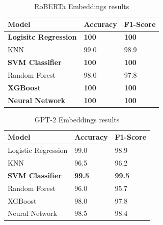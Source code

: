 \begin{table}[hbt!]
\begin{threeparttable}
\caption{RoBERTa Embeddings results}
\label{roberta_embeddings_results}
\begin{tabular}{lll}
\toprule
\headrow Model & Accuracy & F1-Score\\
\midrule
 \textbf{Logisitc Regression}              &      \textbf{100}   &      \textbf{100}   \\
 KNN             &       99.0   &       98.9 \\
 \textbf{SVM Classifier}             &      \textbf{100}   &      \textbf{100}   \\
 Random Forest    &       98.0   &       97.8 \\
 \textbf{XGBoost}         &      \textbf{100}   &      \textbf{100}   \\
 \textbf{Neural Network}   &      \textbf{100}   &      \textbf{100}   \\
\bottomrule
\end{tabular}
\end{threeparttable}
\end{table}

\begin{table}[hbt!]
\begin{threeparttable}
\caption{GPT-2 Embeddings results}
\label{gpt2_embeddings_results}
\begin{tabular}{lll}
\toprule
\headrow Model & Accuracy & F1-Score\\
\midrule
 Logistic Regression                 &       99.0   &       98.9 \\
 KNN                &       96.5 &       96.2 \\
 \textbf{SVM Classifier}                &       \textbf{99.5} &       \textbf{99.5} \\
 Random Forest       &       96.0   &       95.7 \\
 XGBoost            &       98.0   &       97.8 \\
 Neural Network      &       98.5 &       98.4 \\
\bottomrule
\end{tabular}
\end{threeparttable}
\end{table}

